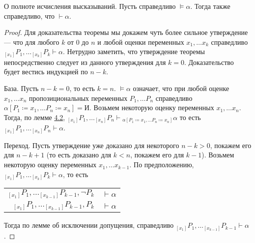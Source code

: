 \begin{theorem}{О полноте исчисления высказываний.}
Пусть справедливо $\models \alpha$. Тогда также справедливо, что $\vdash \alpha$.
\end{theorem}

\begin{proof}
Для доказательства теоремы мы докажем чуть более сильное утверждение --- что 
для любого $k$ от $0$ до $n$ и любой
оценки переменных $x_1, \dots x_k$ справедливо 
$_{[x_1]} P_1, \dots _{[x_k]} P_k \vdash \alpha$.
Нетрудно заметить, что утверждение теоремы непосредственно следует из данного 
утверждения для $k=0$. 
Доказательство будет вестись индукцией по $n-k$.

База. Пусть $n-k=0$, то есть $k=n$. 
$\models \alpha$ означает, что при любой оценке 
$x_1, \dots x_n$ пропозициональных переменных $P_1, \dots P_n$
справедливо $\alpha [P_1 \coloneqq  x_1, \dots P_n \coloneqq  x_n] = \texttt{И}$.
Возьмем некоторую оценку переменных
$x_1, \dots x_n$. Тогда, по лемме \hyperref[valuation_formula]{4.2},
$_{[x_1]} P_1, \dots _{[x_{n}]} P_{n} \vdash {_{\alpha [P_1 \coloneqq  x_1, \dots P_n \coloneqq  x_n]} \alpha}$
то есть $_{[x_1]} P_1, \dots _{[x_{n}]} P_{n} \vdash \alpha$.

Переход. Пусть утверждение уже доказано для некоторого $n-k > 0$, покажем его
для $n-k+1$ (то есть доказано для $k < n$, покажем его для $k-1$).
Возьмем некоторую оценку переменных $x_1, \dots x_{k-1}$.
По предположению, $_{[x_1]} P_1, \dots _{[x_{k}]} P_{k} \vdash \alpha$, то есть

\begin{tabular}{rl}
$_{[x_1]} P_1, \dots _{[x_{k-1}]} P_{k-1}, \neg P_{k}$ & $\vdash \alpha$\\
$_{[x_1]} P_1, \dots _{[x_{k-1}]} P_{k-1}, P_{k}$ & $\vdash \alpha$
\end{tabular}

Тогда по лемме об исключении допущения, справедливо 
$_{[x_1]} P_1, \dots _{[x_{k-1}]} P_{k-1} \vdash \alpha$.

\end{proof}

%
%

